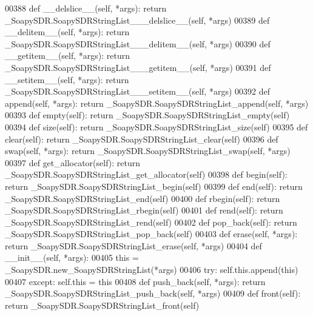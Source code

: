 \begin{DoxyCode}
{{{{00388     \textcolor{keyword}{def }__delslice__(self, *args): \textcolor{keywordflow}{return} \_SoapySDR.SoapySDRStringList\_\_\_delslice\_\_(self, *args)
00389     \textcolor{keyword}{def }__delitem__(self, *args): \textcolor{keywordflow}{return} \_SoapySDR.SoapySDRStringList\_\_\_delitem\_\_(self, *args)
00390     \textcolor{keyword}{def }__getitem__(self, *args): \textcolor{keywordflow}{return} \_SoapySDR.SoapySDRStringList\_\_\_getitem\_\_(self, *args)
00391     \textcolor{keyword}{def }__setitem__(self, *args): \textcolor{keywordflow}{return} \_SoapySDR.SoapySDRStringList\_\_\_setitem\_\_(self, *args)
00392     \textcolor{keyword}{def }append(self, *args): \textcolor{keywordflow}{return} \_SoapySDR.SoapySDRStringList\_append(self, *args)
00393     \textcolor{keyword}{def }empty(self): \textcolor{keywordflow}{return} \_SoapySDR.SoapySDRStringList\_empty(self)
00394     \textcolor{keyword}{def }size(self): \textcolor{keywordflow}{return} \_SoapySDR.SoapySDRStringList\_size(self)
00395     \textcolor{keyword}{def }clear(self): \textcolor{keywordflow}{return} \_SoapySDR.SoapySDRStringList\_clear(self)
00396     \textcolor{keyword}{def }swap(self, *args): \textcolor{keywordflow}{return} \_SoapySDR.SoapySDRStringList\_swap(self, *args)
00397     \textcolor{keyword}{def }get_allocator(self): \textcolor{keywordflow}{return} \_SoapySDR.SoapySDRStringList\_get\_allocator(self)
00398     \textcolor{keyword}{def }begin(self): \textcolor{keywordflow}{return} \_SoapySDR.SoapySDRStringList\_begin(self)
00399     \textcolor{keyword}{def }end(self): \textcolor{keywordflow}{return} \_SoapySDR.SoapySDRStringList\_end(self)
00400     \textcolor{keyword}{def }rbegin(self): \textcolor{keywordflow}{return} \_SoapySDR.SoapySDRStringList\_rbegin(self)
00401     \textcolor{keyword}{def }rend(self): \textcolor{keywordflow}{return} \_SoapySDR.SoapySDRStringList\_rend(self)
00402     \textcolor{keyword}{def }pop_back(self): \textcolor{keywordflow}{return} \_SoapySDR.SoapySDRStringList\_pop\_back(self)
00403     \textcolor{keyword}{def }erase(self, *args): \textcolor{keywordflow}{return} \_SoapySDR.SoapySDRStringList\_erase(self, *args)
00404     \textcolor{keyword}{def }__init__(self, *args): 
00405         this = \_SoapySDR.new\_SoapySDRStringList(*args)
00406         \textcolor{keywordflow}{try}: self.this.append(this)
00407         \textcolor{keywordflow}{except}: self.this = this
00408     \textcolor{keyword}{def }push_back(self, *args): \textcolor{keywordflow}{return} \_SoapySDR.SoapySDRStringList\_push\_back(self, *args)
00409     \textcolor{keyword}{def }front(self): \textcolor{keywordflow}{return} \_SoapySDR.SoapySDRStringList\_front(self)
}}}}
\end{DoxyCode}

